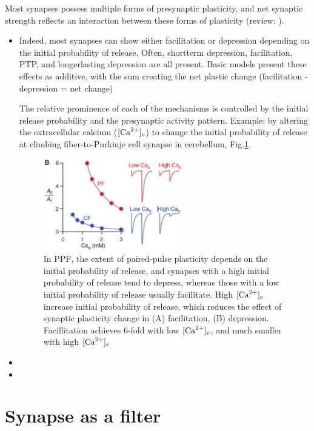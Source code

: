 Most synapses possess multiple forms of presynaptic plasticity, and net synaptic
strength reflects an interaction between these forms of plasticity (review:
\citep{regehr2012}). 
\begin{itemize}
  
  \item  Indeed, most synapses can show either
facilitation or depression depending on the initial probability of release.
Often, shortterm depression, facilitation, PTP, and longerlasting depression are
all present. Basic models present these effects as additive, with the sum
creating the net plastic change (facilitation - depression = net change)

The relative prominence of each of the mechanisms is controlled by the initial
release probability and the presynaptic activity pattern.
Example: by altering the extracellular calcium ($[{\text{Ca}^{2+}}]_e$) to change
the initial probability of release at climbing fiber-to-Purkinje cell synapse in
cerebellum, Fig.\ref{fig:Role_initial-Pr-in-synaptic-plasticity}.


\begin{figure}[htb]
  \centerline{\includegraphics[height=4cm]{./images/Role_initial-Pr-in-synaptic-plasticity.eps}}
  \caption{In PPF, the extent of paired-pulse plasticity depends on the initial
probability of release, and synapses with a high initial probability of release
tend to depress, whereas those with a low initial probability of release usually
facilitate. High $[{\text{Ca}^{2+}}]_e$ increase initial probability of release, which
reduces the effect of synaptic plasticity change in (A) facilitation, (B)
depression. Facillitation achieves 6-fold with low $[{\text{Ca}^{2+}}]_e$, and much smaller
with high $[{\text{Ca}^{2+}}]_e$ }\label{fig:Role_initial-Pr-in-synaptic-plasticity}
\end{figure}
\item 

  \item  
\end{itemize}

\section{Synapse as a filter}

